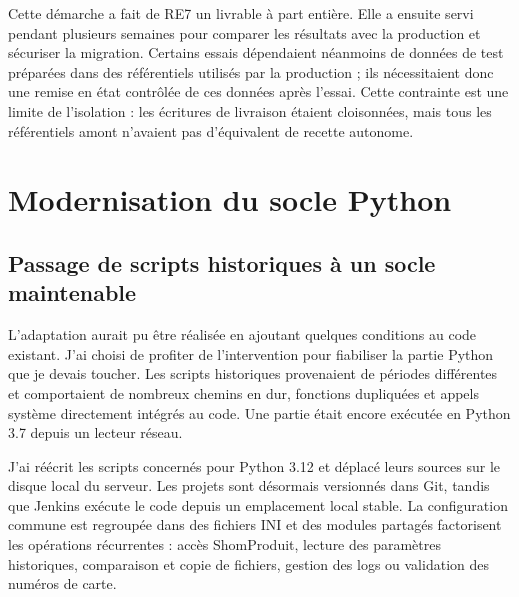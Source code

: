 Cette démarche a fait de RE7 un livrable à part entière. Elle a ensuite servi pendant plusieurs semaines pour comparer les résultats avec la production et sécuriser la migration. Certains essais dépendaient néanmoins de données de test préparées dans des référentiels utilisés par la production ; ils nécessitaient donc une remise en état contrôlée de ces données après l'essai. Cette contrainte est une limite de l'isolation : les écritures de livraison étaient cloisonnées, mais tous les référentiels amont n'avaient pas d'équivalent de recette autonome.

\section{Modernisation du socle Python}

\subsection{Passage de scripts historiques à un socle maintenable}

L'adaptation  aurait pu être réalisée en ajoutant quelques conditions au code existant. J'ai choisi de profiter de l'intervention pour fiabiliser la partie Python que je devais toucher. Les scripts historiques provenaient de périodes différentes et comportaient de nombreux chemins en dur, fonctions dupliquées et appels système directement intégrés au code. Une partie était encore exécutée en Python 3.7 depuis un lecteur réseau.

J'ai réécrit les scripts concernés pour Python 3.12 et déplacé leurs sources sur le disque local du serveur. Les projets sont désormais versionnés dans Git, tandis que Jenkins exécute le code depuis un emplacement local stable. La configuration commune est regroupée dans des fichiers INI et des modules partagés factorisent les opérations récurrentes : accès ShomProduit, lecture des paramètres historiques, comparaison et copie de fichiers, gestion des logs ou validation des numéros de carte.

